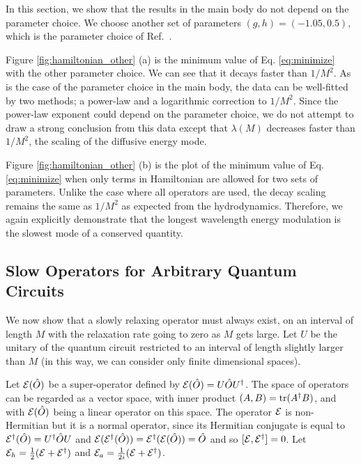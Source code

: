 \documentclass[twocolumn,superscriptaddress, prb]{revtex4-1}
\begin{document}
In this section, we show that the results in the main body do not depend on the parameter choice.
We choose another set of parameters $(g,h) = (-1.05, 0.5)$, which is the parameter choice of Ref.~.

Figure \ref{fig:hamiltonian_other} (a) is the minimum value of Eq. \eqref{eq:minimize} with the other parameter choice.
We can see that it decays faster than $1/M^2$. As is the case of the parameter choice in the main body,
the data can be well-fitted by two methods; a power-law and a logarithmic correction to $1/M^2$.
Since the power-law exponent could depend on the parameter choice, we do not attempt to draw a strong conclusion from this data
except that $\lambda(M)$ decreases faster than $1/M^2$,
the scaling of the diffusive energy mode.

Figure \ref{fig:hamiltonian_other} (b) is the plot of the minimum value of Eq. \eqref{eq:minimize} when only terms in Hamiltonian are allowed
for two sets of parameters. Unlike the case where all operators are used,
the decay scaling remains the same as $1/M^2$ as expected from the hydrodynamics.
Therefore, we again explicitly demonstrate that the longest wavelength energy modulation is the slowest mode of a conserved quantity.


\subsection{Slow Operators for Arbitrary Quantum Circuits}
We now show that a slowly relaxing operator must always exist, on an interval of length $M$ with the relaxation rate going to zero as $M$ gets large.  Let $U$ be the unitary of the quantum circuit restricted to an interval of length slightly larger than $M$ (in this way, we can consider only finite dimensional spaces).

Let ${\cal E}(\hat{O})$ be a super-operator defined by ${\cal E}(\hat{O})=U\hat{O}U^\dagger$.  The space of operators can be regarded as a vector space, with inner product $(A,B)={\rm tr}(A^\dagger B)$, and with ${\cal E}(\hat{O})$ being a linear operator on this space.  The operator ${\cal E}$ is non-Hermitian but it is a normal operator, since its Hermitian conjugate is equal to ${\cal E}^\dagger(\hat{O})=U^\dagger \hat{O} U$ and ${\cal E}({\cal E}^\dagger(\hat{O}))={\cal E}^\dagger({\cal E}(\hat{O}))=\hat{O}$ and so $[{\cal E},{\cal E}^\dagger]=0$.
Let ${\cal E}_h=\frac{1}{2}({\cal E}+{\cal E}^\dagger)$ and ${\cal E}_a=\frac{1}{2i}({\cal E}+{\cal E}^\dagger)$.
\end{document}
